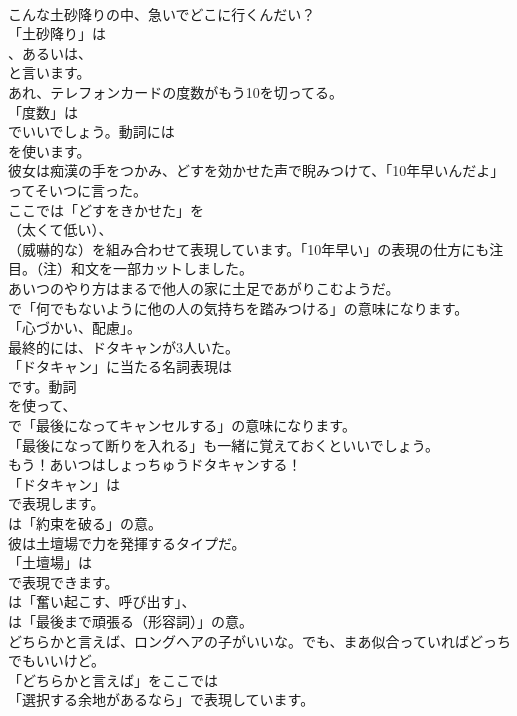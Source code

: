 \documentclass[8pt]{extreport}
\begin{document}
\begin{CJK}{UTF8}{min}
\\	こんな土砂降りの中、急いでどこに行くんだい？ 
\\	「土砂降り」は 
\\	、あるいは、
\\	と言います。	
\\	あれ、テレフォンカードの度数がもう10を切ってる。 
\\	「度数」は
\\	でいいでしょう。動詞には
\\	を使います。	
\\	彼女は痴漢の手をつかみ、どすを効かせた声で睨みつけて、「10年早いんだよ」ってそいつに言った。 
\\	ここでは「どすをきかせた」を 
\\	（太くて低い）、
\\	（威嚇的な）を組み合わせて表現しています。「10年早い」の表現の仕方にも注目。（注）和文を一部カットしました。	
\\	あいつのやり方はまるで他人の家に土足であがりこむようだ。 
\\	で「何でもないように他の人の気持ちを踏みつける」の意味になります。
\\	「心づかい、配慮」。	
\\	最終的には、ドタキャンが3人いた。 
\\	「ドタキャン」に当たる名詞表現は
\\	です。動詞
\\	を使って、
\\	で「最後になってキャンセルする」の意味になります。
\\	「最後になって断りを入れる」も一緒に覚えておくといいでしょう。	
\\	もう！あいつはしょっちゅうドタキャンする！ 
\\	「ドタキャン」は 
\\	で表現します。
\\	は「約束を破る」の意。	
\\	彼は土壇場で力を発揮するタイプだ。 
\\	「土壇場」は
\\	で表現できます。
\\	は「奮い起こす、呼び出す」、
\\	は「最後まで頑張る（形容詞）」の意。	
\\	どちらかと言えば、ロングヘアの子がいいな。でも、まあ似合っていればどっちでもいいけど。 
\\	「どちらかと言えば」をここでは
\\	「選択する余地があるなら」で表現しています。	

\end{CJK}
\end{document}
